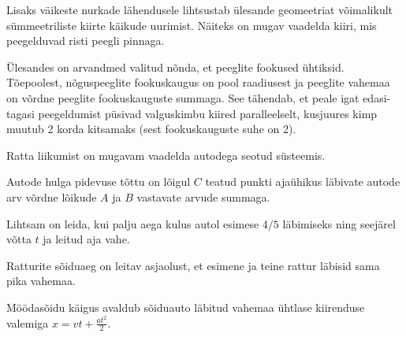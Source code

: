 \documentclass[10pt, twoside]{article}
\begin{document}
{
\hint
Lisaks väikeste nurkade lähendusele lihtsustab ülesande geomeetriat võimalikult sümmeetriliste kiirte käikude uurimist. Näiteks on mugav vaadelda kiiri, mis peegelduvad risti peegli pinnaga.
\probend
\bigskip


\hint
Ülesandes on arvandmed valitud nõnda, et peeglite fookused ühtiksid. Tõepoolest, nõguspeeglite fookuskaugus on pool raadiusest ja peeglite vahemaa on võrdne peeglite fookuskauguste summaga. See tähendab, et peale igat edasi-tagasi peegeldumist püsivad valguskimbu kiired paralleelselt, kusjuures kimp muutub 2 korda kitsamaks (sest fookuskauguste suhe on 2).
\probend
\bigskip


\hint
Ratta liikumist on mugavam vaadelda autodega seotud süsteemis.
\probend
\bigskip


\hint
Autode hulga pidevuse tõttu on lõigul $C$ teatud punkti ajaühikus läbivate autode arv võrdne lõikude $A$ ja $B$ vastavate arvude summaga.
\probend
\bigskip


\hint
Lihtsam on leida, kui palju aega kulus autol esimese $4/5$ läbimiseks ning seejärel võtta $t$ ja leitud aja vahe.
\probend
\bigskip


\hint
Ratturite sõiduaeg on leitav asjaolust, et esimene ja teine rattur läbisid sama pika vahemaa.
\probend
\bigskip


\hint
Möödasõidu käigus avaldub sõiduauto läbitud vahemaa ühtlase kiirenduse valemiga $x = vt + \frac{at^2}{2}$.
\probend
\bigskip

}
\end{document}
